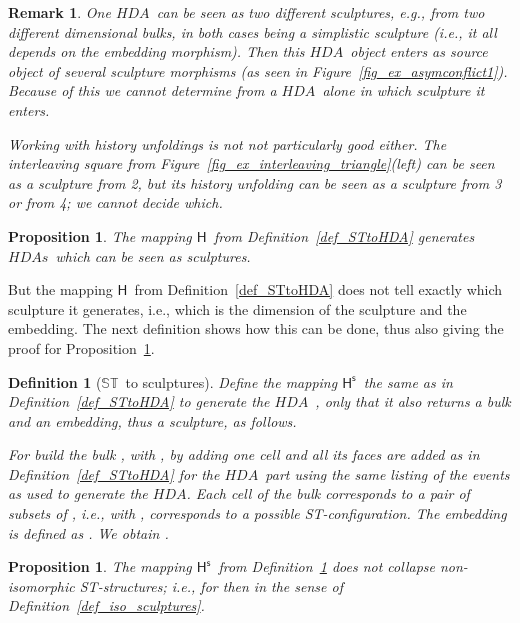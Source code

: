 \documentclass[submission,copyright,creativecommons]{eptcs}
\newtheorem{proposition}[theorem]{Proposition}
\newtheorem{definition}[theorem]{Definition}
\newtheorem{remark}[theorem]{Remark}
\newcounter{case}
\newcommand\HDA{\ensuremath{\mathit{HDA}}}
\newcommand\HDAs{\ensuremath{\mathit{HDAs}}}
\newcommand\allST{\ensuremath{\mathbb{ST}}}
\newcommand\stintoh{\ensuremath{\mathsf{H}}}
\newcommand\stintosculpture{\ensuremath{\stintoh^{\mathsf{s}}}}
\begin{document}
\begin{remark}
One \HDA\ can be seen as two different sculptures, e.g., from two different dimensional bulks, in both cases being a simplistic sculpture (i.e., it all depends on the embedding morphism). Then this \HDA\ object enters as source object of several sculpture morphisms (as seen in Figure~\ref{fig_ex_asymconflict1}). Because of this we cannot determine from a \HDA\ alone in which sculpture it enters.

Working with history unfoldings is not not particularly good either. The interleaving square from Figure~\ref{fig_ex_interleaving_triangle}(left) can be seen as a sculpture from 2, but its history unfolding can be seen as a sculpture from 3 or from 4; we cannot decide which.
\end{remark}




\begin{proposition}\label{prop_HgivesSculptures}
The mapping \stintoh\ from Definition~\ref{def_STtoHDA} generates \HDAs\ which can be seen as sculptures.
\end{proposition}


But the mapping \stintoh\ from Definition~\ref{def_STtoHDA} does not tell exactly which sculpture it generates, i.e., which is the dimension of the sculpture and the embedding.
The next definition shows how this can be done, thus also giving the proof for Proposition~\ref{prop_HgivesSculptures}.

\begin{definition}[\allST\ to sculptures]\label{def_stintosculptures}
Define the mapping \stintosculpture\ the same as in Definition~\ref{def_STtoHDA} to generate the \HDA\ , only that it also returns a bulk and an embedding, thus a sculpture, as follows.

For  build the bulk , with , by adding one cell  and all its faces are added as in Definition~\ref{def_STtoHDA} for the \HDA\ part using the same listing of the events as used to generate the \HDA. Each cell of the bulk corresponds to a pair of subsets of , i.e.,  with , corresponds to a possible ST-configuration. 
The embedding  is defined as .
We obtain .
\end{definition}

\begin{proposition}
The mapping \stintosculpture\ from Definition~\ref{def_stintosculptures} does not collapse non-isomorphic ST-structures; i.e., for  then  in the sense of Definition~\ref{def_iso_sculptures}.
\end{proposition}
\end{document}
